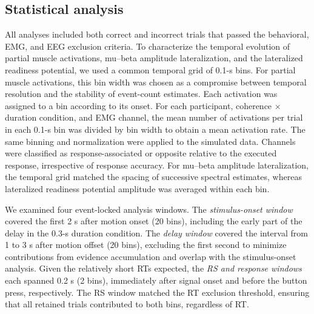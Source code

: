 \documentclass[a4paper,11pt]{article}
\theoremstyle{definition}
\newcommand{\1}{\mathbbm{1}}
\begin{document}
\subsection{Statistical analysis}

All analyses included both correct and incorrect trials that passed the behavioral, EMG, and EEG exclusion criteria. To characterize the temporal evolution of partial muscle activations, mu--beta amplitude lateralization, and the lateralized readiness potential, we used a common temporal grid of 0.1-s bins. For partial muscle activations, this bin width was chosen as a compromise between temporal resolution and the stability of event-count estimates. Each activation was assigned to a bin according to its onset. For each participant, coherence $\times$ duration condition, and EMG channel, the mean number of activations per trial in each 0.1-s bin was divided by bin width to obtain a mean activation rate. The same binning and normalization were applied to the simulated data. Channels were classified as response-associated or opposite relative to the executed response, irrespective of response accuracy. For mu--beta amplitude lateralization, the temporal grid matched the spacing of successive spectral estimates, whereas lateralized readiness potential amplitude was averaged within each bin.

We examined four event-locked analysis windows. The \textit{stimulus-onset window} covered the first 2 s after motion onset (20 bins), including the early part of the delay in the 0.3-s duration condition. The \textit{delay window} covered the interval from 1 to 3 s after motion offset (20 bins), excluding the first second to minimize contributions from evidence accumulation and overlap with the stimulus-onset analysis. Given the relatively short RTs expected, the \textit{RS and response windows} each spanned 0.2 s (2 bins), immediately after signal onset and before the button press, respectively. The RS window matched the RT exclusion threshold, ensuring that all retained trials contributed to both bins, regardless of RT.
\end{document}
